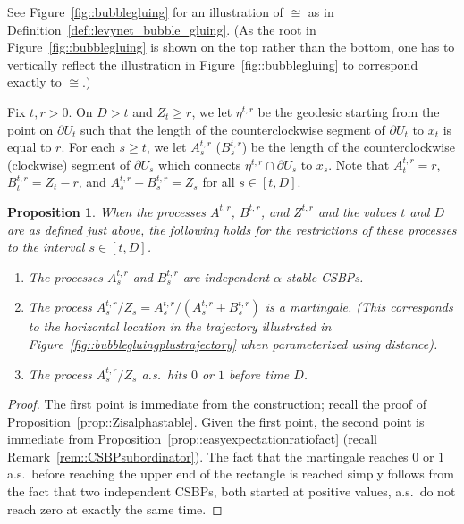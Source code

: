 \documentclass[10pt]{amsart}
\theoremstyle{plain}
\numberwithin{theorem}{section}
\newtheorem{proposition}[theorem]{Proposition}
\theoremstyle{definition}
\begin{document}
See Figure~\ref{fig::bubblegluing} for an illustration of $\cong$ as in Definition~\ref{def::levynet_bubble_gluing}. (As the root in Figure~\ref{fig::bubblegluing} is shown on the top rather than the bottom, one has to vertically reflect the illustration in Figure~\ref{fig::bubblegluing} to correspond exactly to $\cong$.)

Fix $t, r > 0$. On $D > t$ and $Z_t \geq r$, we let $\eta^{t,r}$ be the geodesic starting from the point on $\partial U_t$ such that the length of the counterclockwise segment of $\partial U_t$ to $x_t$ is equal to $r$. For each $s \geq t$, we let $A_s^{t,r}$ (\resp $B_s^{t,r}$) be the length of the counterclockwise (\resp clockwise) segment of $\partial U_s$ which connects $\eta^{t,r} \cap \partial U_s$ to $x_s$. Note that $A_t^{t,r} = r$, $B_t^{t,r} = Z_t - r$, and $A_s^{t,r} + B_s^{t,r} = Z_s$ for all $s \in [t,D]$.

\begin{proposition}
\label{prop::levynetgeodesictrajectoriesdetermined}
When the processes $A^{t,r}$, $B^{t,r}$, and $Z^{t,r}$ and the values $t$ and $D$ are as defined just above, the following holds for the restrictions of these processes to the interval $s \in [t, D]$.
\begin{enumerate}
\item The processes $A_s^{t,r}$ and $B_s^{t,r}$ are independent $\alpha$-stable CSBPs.
\item The process $A_s^{t,r} / Z_s = A_s^{t,r} / (A_s^{t,r} + B_s^{t,r})$ is a martingale. (This corresponds to the horizontal location in the trajectory illustrated in Figure~\ref{fig::bubblegluingplustrajectory} when parameterized using distance).
\item The process $A_s^{t,r} / Z_s$ a.s.\ hits $0$ or $1$ before time $D$.
\end{enumerate}
\end{proposition}
\begin{proof}
The first point is immediate from the construction; recall the proof of Proposition~\ref{prop::Zisalphastable}. Given the first point, the second point is immediate from Proposition~\ref{prop::easyexpectationratiofact} (recall Remark~\ref{rem::CSBPsubordinator}). The fact that the martingale reaches $0$ or $1$ a.s.\ before reaching the upper end of the rectangle is reached simply follows from the fact that two independent CSBPs, both started at positive values, a.s.\ do not reach zero at exactly the same time.
\end{proof}
\end{document}
